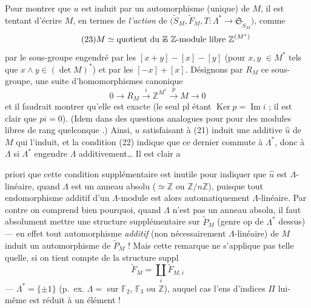 \documentclass[11pt,a4paper]{article}
\begin{document}
Pour montrer que $u$ est induit par un automorphisme (unique) de $M$, il est tentant
d'écrire $M$, en termes de \emph{l'action} de
$\bigl(\widetilde{S}_M, \widetilde{F}_M, T\colon \Lambda^{*}\to\mathfrak{S}_{\widetilde{S}_M}\bigr)$, comme
\[
\tag{23}
M \simeq \text{quotient du \struck{$\mathbb{Z}$} $\mathbb{Z}$-module libre } \mathbb{Z}^{(M^{*})}
\]
par le sous-groupe engendré par les $[x+y]-[x]-[y]$ (pour $x,y$ \struck{\ill{}} $\in M^{*}$
tels que $x\wedge y\in(\det M)^{*}$) et par les $[-x]+[x]$. Désignons par $R_M$ ce
sous-groupe, une suite d'homomorphismes canonique
\[
\tag{24}
0 \longrightarrow R_M \xrightarrow{\ i\ } \mathbb{Z}^{M^{*}} \xrightarrow{\ p\ } M \longrightarrow 0
\]
et il faudrait montrer qu'elle est exacte (le seul pl étant
$\operatorname{Ker} p = \operatorname{Im} i$ ; il est clair que $pi = 0$). (Idem dans des
questions analogues pour \ill{} pour des modules libres de rang quelconque .)
Ainsi, $u$ satisfaisant à (21) induit une  additive $\hat u$ de $M$
qui l'induit, et la condition (22) indique que ce dernier commute à $\Lambda^{*}$, donc
à $\Lambda$ si $\Lambda^{*}$ engendre $\Lambda$ additivement… Il est clair a

priori que cette condition supplémentaire est inutile pour indiquer que $\hat u$ est
$\Lambda$-linéaire, quand $\Lambda$ est un anneau absolu ($\simeq\mathbb{Z}$ ou
$\mathbb{Z}/n\mathbb{Z}$), puisque tout endomorphisme additif d'un $\Lambda$-module est
alors automatiquement $\Lambda$-linéaire. Par contre on comprend bien pourquoi, quand
$\Lambda$ n'est pas un anneau absolu, il faut absolument mettre une structure
supplémentaire sur $\widetilde{P}_M$  (genre
op de $\Lambda^{*}$ dessus) — en effet tout automorphisme
\emph{additif} (non nécessairement $\Lambda$-linéaire) de $M$ induit un automorphisme
de $\widetilde{P}_M$ ! Mais cette remarque ne s'applique pas telle quelle, si on tient
compte de la structure suppl
\[
\widetilde{F}_M = \coprod_i \widetilde{F}_{M,i}
\]
—   $\Lambda^{*}=\{\pm1\}$ (p.~ex. $\Lambda =$
\struck{\ill{}}  sur $\mathbb{F}_2$, $\mathbb{F}_3$ ou
$\mathbb{Z}$), auquel cas l'ens d'indices $\Pi$ lui-même est réduit à un
élément !
\end{document}
